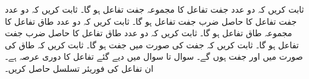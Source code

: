 \quad 
ثابت کریں کہ دو عدد جفت تفاعل کا مجموعہ جفت تفاعل ہو گا۔
\quad 
ثابت کریں کہ دو عدد جفت تفاعل کا حاصل ضرب جفت تفاعل ہو گا۔
\quad 
ثابت کریں کہ دو عدد طاق تفاعل کا مجموعہ طاق تفاعل ہو گا۔
\quad 
ثابت کریں کہ دو عدد طاق تفاعل کا حاصل ضرب جفت تفاعل ہو گا۔
\quad
ثابت کریں کہ جفت  کی صورت میں  جفت ہو گا۔
\quad
ثابت کریں کہ طاق  کی صورت میں  اور  جفت ہوں گے۔
سوال  تا سوال  میں دیے گئے تفاعل کا دوری عرصہ  ہے۔ان تفاعل کی فوریئر تسلسل حاصل کریں۔

